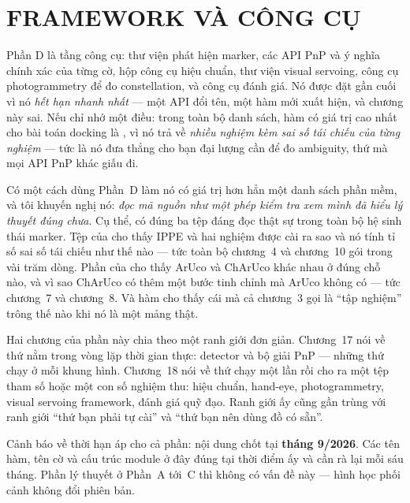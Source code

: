 \documentclass[../marker.tex]{subfiles}
\begin{document}
\part{FRAMEWORK VÀ CÔNG CỤ}
\begin{tomtat}
Phần D là tầng công cụ: thư viện phát hiện marker, các API PnP và ý nghĩa chính xác của từng cờ, hộp công cụ hiệu chuẩn, thư viện visual servoing, công cụ photogrammetry để đo constellation, và công cụ đánh giá. Nó được đặt gần cuối vì nó \emph{hết hạn nhanh nhất} --- một API đổi tên, một hàm mới xuất hiện, và chương này sai. Nếu chỉ nhớ một điều: trong toàn bộ danh sách, hàm có giá trị cao nhất cho bài toán docking là , vì nó trả về \emph{nhiều nghiệm kèm sai số tái chiếu của từng nghiệm} --- tức là nó đưa thẳng cho bạn đại lượng cần để đo ambiguity, thứ mà mọi API PnP khác giấu đi.
\end{tomtat}

Có một cách dùng Phần~D làm nó có giá trị hơn hẳn một danh sách phần mềm, và tôi khuyến nghị nó: \emph{đọc mã nguồn như một phép kiểm tra xem mình đã hiểu lý thuyết đúng chưa}. Cụ thể, có đúng ba tệp đáng đọc thật sự trong toàn bộ hệ sinh thái marker. Tệp  của  cho thấy IPPE và hai nghiệm được cài ra sao và nó tính tỉ số sai số tái chiếu như thế nào --- tức toàn bộ chương~4 và chương~10 gói trong vài trăm dòng. Phần  của  cho thấy ArUco và ChArUco khác nhau ở đúng chỗ nào, và vì sao ChArUco có thêm một bước tinh chỉnh mà ArUco không có --- tức chương~7 và chương~8. Và hàm  cho thấy cái mà cả chương~3 gọi là ``tập nghiệm'' trông thế nào khi nó là một mảng thật.

Hai chương của phần này chia theo một ranh giới đơn giản. Chương~17 nói về thứ nằm trong vòng lặp thời gian thực: detector và bộ giải PnP --- những thứ chạy ở mỗi khung hình. Chương~18 nói về thứ chạy một lần rồi cho ra một tệp tham số hoặc một con số nghiệm thu: hiệu chuẩn, hand-eye, photogrammetry, visual servoing framework, đánh giá quỹ đạo. Ranh giới ấy cũng gần trùng với ranh giới ``thứ bạn phải tự cài'' và ``thứ bạn nên dùng đồ có sẵn''.

Cảnh báo về thời hạn áp cho cả phần: nội dung chốt tại \textbf{tháng 9/2026}. Các tên hàm, tên cờ và cấu trúc module ở đây đúng tại thời điểm ấy và cần rà lại mỗi sáu tháng. Phần lý thuyết ở Phần~A tới~C thì không có vấn đề này --- hình học phối cảnh không đổi phiên bản.



\ifSubfilesClassLoaded{\printbibliography[title={Nguồn}]}{}
\end{document}
